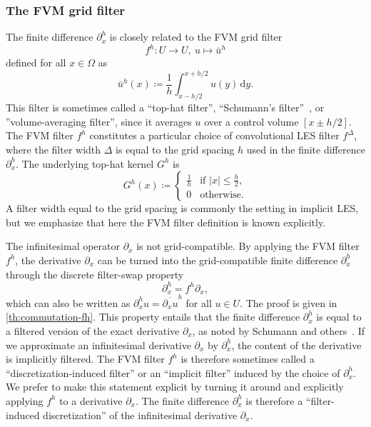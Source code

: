 \documentclass[preprint,twocolumn,5p]{elsarticle}
\begin{document}
\subsubsection{The FVM grid filter}


The finite difference $\partial^h_x$ is closely related to the FVM grid filter
\begin{equation}
    f^h : U \to U, \ u \mapsto \bar{u}^h
\end{equation}
defined for all $x \in \Omega$ as
\begin{equation} \label{eq:cl-gridfilter}
    \bar{u}^h(x) \coloneq \frac{1}{h}
    \int_{x - h / 2}^{x + h / 2} u(y) \, \mathrm{d} y.
\end{equation}
This filter is sometimes called a ``top-hat filter'',
``Schumann's filter''~\cite{schumannSubgridScaleModel1975},
or ''volume-averaging filter'', since it averages $u$ over a control volume
$[x \pm h / 2]$. The FVM filter $f^h$ constitutes a particular choice of
convolutional LES filter $f^\Delta$, where the filter width $\Delta$ is equal
to the grid spacing $h$ used in the finite difference $\partial^h_x$. The
underlying top-hat kernel $G^h$ is
\begin{equation}
    G^h(x) \coloneq
    \begin{cases}
        \frac{1}{h} & \text{if } |x| \leq \frac{h}{2}, \\
        0 & \text{otherwise.}
    \end{cases}
\end{equation}
A filter width equal to the grid spacing is commonly the setting in implicit LES,
but we emphasize that here the FVM filter definition is known explicitly.



The infinitesimal operator $\partial_x$ is not grid-compatible.
By applying the FVM filter $f^h$, the derivative $\partial_x$ can be turned
into the grid-compatible finite difference $\partial^h_x$ through the
discrete filter-swap property
\begin{equation} \label{eq:cl-continuous-commutation}
    \partial^h_x = f^h \partial_x,
\end{equation}
which can also be written as
$\partial^h_x u = \overline{\partial_x u}^h$ for all $u \in U$.
The proof is given in \cref{th:commutation-fh}.
This property entails that the finite difference $\partial^h_x$
is equal to a filtered version of the exact derivative $\partial_x$,
as noted by Schumann and
others~\cite{schumannSubgridScaleModel1975,
rogalloNumericalSimulationTurbulent1984,
lundUseExplicitFilters2003}.
If we approximate an infinitesimal derivative $\partial_x$ by $\partial^h_x$, the
content of the derivative is implicitly filtered.
The FVM filter $f^h$ is therefore 
sometimes called a ``discretization-induced filter''
or an ``implicit filter'' induced by the choice of $\partial^h_x$.
We prefer to make this statement explicit by turning it around and
explicitly applying $f^h$ to a derivative $\partial_x$.
The finite difference $\partial^h_x$ is therefore a
``filter-induced discretization'' of the infinitesimal derivative $\partial_x$.
\end{document}
